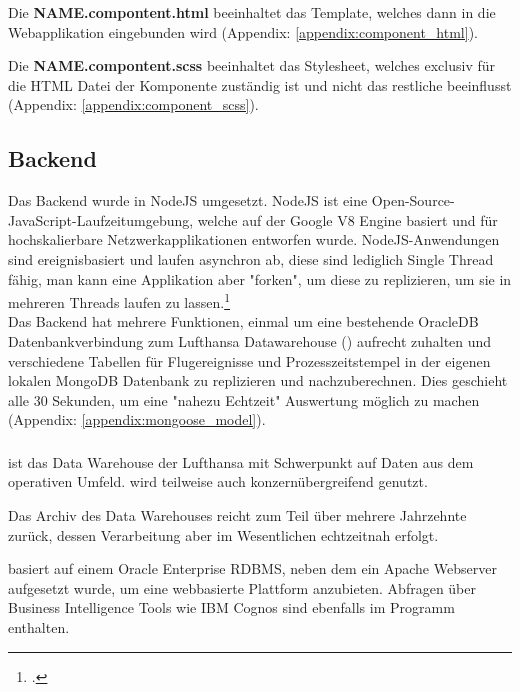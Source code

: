 	{
		\noindent
		Die \textbf{NAME.compontent.html} beeinhaltet das  Template, welches dann in die Webapplikation eingebunden wird (Appendix: \ref{appendix:component_html}).
	}
	\vspace{10pt}

	{
		\noindent
		Die \textbf{NAME.compontent.scss} beeinhaltet das  Stylesheet, welches exclusiv für die HTML Datei der Komponente zuständig ist und nicht das restliche  beeinflusst (Appendix: \ref{appendix:component_scss}).
	}
	

	

	\subsection{Backend}
	Das Backend wurde in NodeJS umgesetzt. NodeJS ist eine Open-Source-JavaScript-Laufzeitumgebung, welche auf der Google V8 Engine basiert und für hochskalierbare Netzwerkapplikationen entworfen wurde. NodeJS-Anwendungen sind ereignisbasiert und laufen asynchron ab, diese sind lediglich Single Thread fähig, man kann eine Applikation aber "forken", um diese zu replizieren, um sie in mehreren Threads laufen zu lassen.\footcite{4}\\
	Das Backend hat mehrere Funktionen, einmal um eine bestehende OracleDB Datenbankverbindung zum Lufthansa Datawarehouse () aufrecht zuhalten und verschiedene Tabellen für Flugereignisse und Prozesszeitstempel in der eigenen lokalen MongoDB Datenbank zu replizieren und nachzuberechnen. Dies geschieht alle 30 Sekunden, um eine "nahezu Echtzeit" Auswertung möglich zu machen (Appendix: \ref{appendix:mongoose_model}).



	\subsubsection{}

	{
		\noindent
		 ist das Data Warehouse der Lufthansa mit Schwerpunkt auf Daten aus dem operativen Umfeld.  wird teilweise auch konzernübergreifend genutzt.
	}

	{
		\noindent
		Das Archiv des Data Warehouses reicht zum Teil über mehrere Jahrzehnte zurück, dessen Verarbeitung aber im Wesentlichen echtzeitnah erfolgt.
	}

	{
		\noindent
		 basiert auf einem Oracle Enterprise RDBMS, neben dem ein Apache Webserver aufgesetzt wurde, um eine webbasierte Plattform anzubieten. Abfragen über Business Intelligence Tools wie IBM Cognos sind ebenfalls im Programm enthalten.
	}


